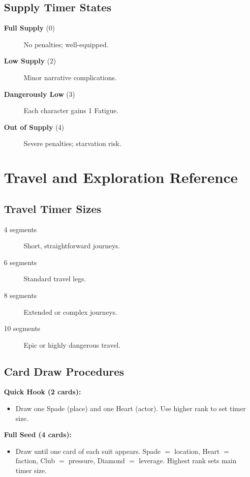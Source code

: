 \subsection{Supply Timer States}\label{subsec:supply_ref}
\begin{description}
    \item[\textbf{Full Supply} (0)] No penalties; well-equipped.
    \item[\textbf{Low Supply} (2)] Minor narrative complications.
    \item[\textbf{Dangerously Low} (3)] Each character gains 1 Fatigue.
    \item[\textbf{Out of Supply} (4)] Severe penalties; starvation risk.
\end{description}

\newpage
\section{Travel and Exploration Reference}\label{sec:travel_reference}

\subsection{Travel Timer Sizes}\label{subsec:travel_timers_ref}
\begin{description}
    \item[4 segments] Short, straightforward journeys.
    \item[6 segments] Standard travel legs.
    \item[8 segments] Extended or complex journeys.
    \item[10 segments] Epic or highly dangerous travel.
\end{description}

\subsection{Card Draw Procedures}\label{subsec:card_draw_ref}
\textbf{Quick Hook (2 cards):}
\begin{itemize}
    \item Draw one Spade (place) and one Heart (actor). Use higher rank to set timer size.
\end{itemize}
\textbf{Full Seed (4 cards):}
\begin{itemize}
    \item Draw until one card of each suit appears. Spade $=$ location, Heart $=$ faction, Club $=$ pressure, Diamond $=$ leverage. Highest rank sets main timer size.
\end{itemize}

